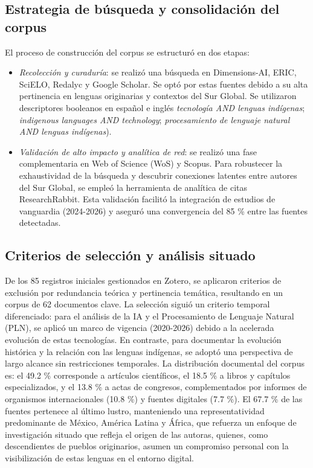 \documentclass[spanish]{textolivre}
\begin{document}
\subsection{Estrategia de búsqueda y consolidación del corpus}
El proceso de construcción del corpus se estructuró en dos etapas:

\begin{itemize}
    \item \textit{Recolección y curaduría}: se realizó una búsqueda en Dimensions-AI, ERIC, SciELO, Redalyc y Google Scholar. Se optó por estas fuentes debido a su alta pertinencia en lenguas originarias y contextos del Sur Global. Se utilizaron descriptores booleanos en español e inglés\textit{ tecnología AND lenguas indígenas}; \textit{indigenous languages AND technology}; \textit{procesamiento de lenguaje natural AND lenguas indígenas}).
    \item \textit{Validación de alto impacto y analítica de red}: se realizó una fase complementaria en Web of Science (WoS) y Scopus. Para robustecer la exhaustividad de la búsqueda y descubrir conexiones latentes entre autores del Sur Global, se empleó la herramienta de analítica de citas ResearchRabbit. Esta validación facilitó la integración de estudios de vanguardia (2024-2026) y aseguró una convergencia del 85 \% entre las fuentes detectadas.
\end{itemize}

\subsection{Criterios de selección y análisis situado}

De los 85 registros iniciales gestionados en Zotero, se aplicaron criterios de exclusión por redundancia teórica y pertinencia temática, resultando en un corpus de 62 documentos clave. La selección siguió un criterio temporal diferenciado: para el análisis de la IA y el Procesamiento de Lenguaje Natural (PLN), se aplicó un marco de vigencia (2020-2026) debido a la acelerada evolución de estas tecnologías. En contraste, para documentar la evolución histórica y la relación con las lenguas indígenas, se adoptó una perspectiva de largo alcance sin restricciones temporales. La distribución documental del corpus es: el 49.2 \% corresponde a artículos científicos, el 18.5 \% a libros y capítulos especializados, y el 13.8 \% a actas de congresos, complementados por informes de organismos internacionales (10.8 \%) y fuentes digitales (7.7 \%). El 67.7 \% de las fuentes pertenece al último lustro, manteniendo una representatividad predominante de México, América Latina y África, que refuerza un enfoque de investigación situado que refleja el origen de las autoras, quienes, como descendientes de pueblos originarios, asumen un compromiso personal con la visibilización de estas lenguas en el entorno digital.
\end{document}

